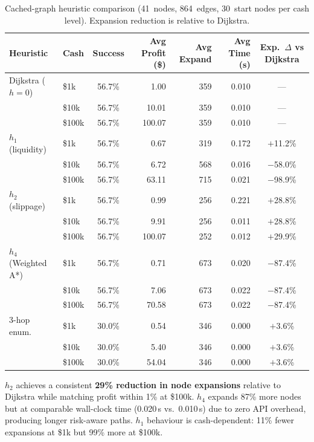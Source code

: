 \begin{table}[t]
\centering
\small
\setlength{\tabcolsep}{5pt}
\caption{Cached-graph heuristic comparison (41~nodes, 864~edges, 30~start nodes per cash level). Expansion reduction is relative to Dijkstra.}
\label{tab:heuristic-performance}
\begin{tabular}{llcrrrc}
\toprule
\textbf{Heuristic} 
& \textbf{Cash} 
& \textbf{Success} 
& \textbf{Avg Profit (\$)} 
& \textbf{Avg Expand} 
& \textbf{Avg Time (s)} 
& \textbf{Exp.\ $\Delta$ vs Dijkstra} \\
\midrule

Dijkstra ($h{=}0$)
& \$1k      & 56.7\% &   1.00 &  359 & 0.010 & --- \\
& \$10k     & 56.7\% &  10.01 &  359 & 0.010 & --- \\
& \$100k    & 56.7\% & 100.07 &  359 & 0.010 & --- \\
\midrule

$h_1$ (liquidity)
& \$1k      & 56.7\% &   0.67 &  319 & 0.172 & $+$11.2\% \\
& \$10k     & 56.7\% &   6.72 &  568 & 0.016 & $-$58.0\% \\
& \$100k    & 56.7\% &  63.11 &  715 & 0.021 & $-$98.9\% \\
\midrule

$h_2$ (slippage)
& \$1k      & 56.7\% &   0.99 &  256 & 0.221 & $+$28.8\% \\
& \$10k     & 56.7\% &   9.91 &  256 & 0.011 & $+$28.8\% \\
& \$100k    & 56.7\% & 100.07 &  252 & 0.012 & $+$29.9\% \\
\midrule

$h_4$ (Weighted A*)
& \$1k      & 56.7\% &   0.71 &  673 & 0.020 & $-$87.4\% \\
& \$10k     & 56.7\% &   7.06 &  673 & 0.022 & $-$87.4\% \\
& \$100k    & 56.7\% &  70.58 &  673 & 0.022 & $-$87.4\% \\
\midrule

3-hop enum.
& \$1k      & 30.0\% &   0.54 &  346 & 0.000 & $+$3.6\% \\
& \$10k     & 30.0\% &   5.40 &  346 & 0.000 & $+$3.6\% \\
& \$100k    & 30.0\% &  54.04 &  346 & 0.000 & $+$3.6\% \\

\bottomrule
\end{tabular}
\end{table}

$h_2$ achieves a consistent \textbf{29\% reduction in node expansions} relative to Dijkstra while matching profit within 1\% at \$100k. $h_4$ expands 87\% more nodes but at comparable wall-clock time (0.020\,s vs.\ 0.010\,s) due to zero API overhead, producing longer risk-aware paths. $h_1$ behaviour is cash-dependent: 11\% fewer expansions at \$1k but 99\% more at \$100k.
